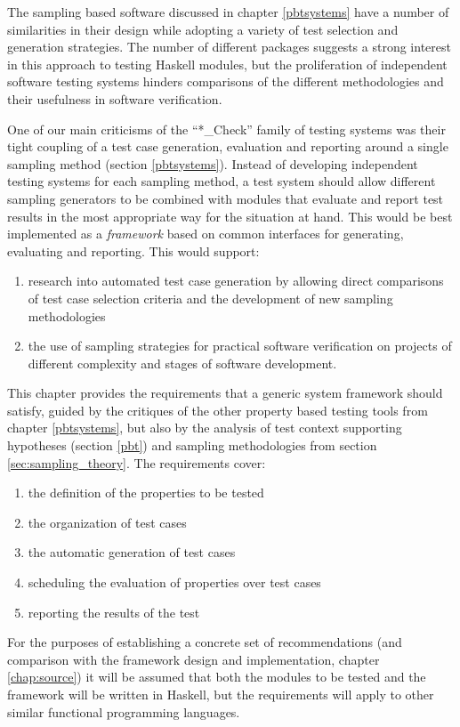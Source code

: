 The sampling based \pbt software discussed in chapter \ref{pbtsystems}
have a number of similarities in their design
while adopting a variety of test selection and generation strategies.
The number of different packages suggests 
a strong interest in this approach to testing Haskell modules,
but the proliferation of independent software testing systems 
hinders comparisons of the different methodologies and their usefulness in software verification.

One of our main criticisms of the ``*\_Check'' family of testing systems
was their tight coupling of a test case generation, evaluation and reporting
around a single sampling method (section \ref{pbtsystems}).
Instead of developing independent testing systems for each sampling method,
a test system should allow different sampling generators to be combined with
modules that evaluate and report test results in the most appropriate way for the situation at hand.
This would be best implemented as a \emph{framework} 
based on common interfaces for generating, evaluating and reporting.
This would support:
\begin{enumerate}
\item research into automated test case generation
by allowing direct comparisons of test case selection criteria
and the development of new sampling methodologies
\item the use of sampling strategies for practical software verification 
on projects of different complexity and stages of software development.
\end{enumerate}

This chapter provides the requirements that a generic \pbt system framework should satisfy,
guided by the critiques of the other property based testing tools from chapter \ref{pbtsystems},
but also by the analysis of test context supporting hypotheses (section \ref{pbt}) and 
sampling methodologies from section \ref{sec:sampling_theory}.
The requirements cover:
\begin{enumerate}
\item the definition of the properties to be tested
\item the organization of test cases
\item the automatic generation of test cases
\item scheduling the evaluation of properties over test cases
\item reporting the results of the test
\end{enumerate}
\noindent
For the purposes of establishing a concrete set of recommendations
(and comparison with the \GC framework design and implementation, chapter \ref{chap:source})
it will be assumed that both the modules to be tested and
the \pbt framework will be written in Haskell,
but the requirements will apply to other similar functional programming languages.

